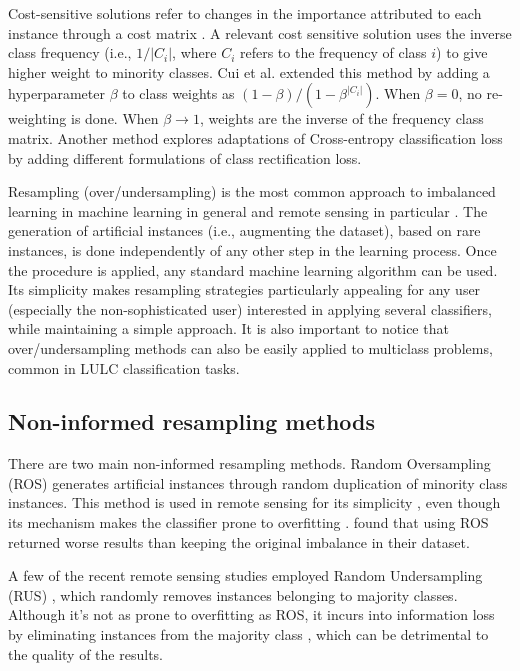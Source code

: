 Cost-sensitive solutions refer to changes in the importance attributed to each
instance through a cost matrix \cite{Huang2016,Cui2019,Dong2017}. A
relevant cost sensitive solution
\cite{Huang2016} uses  the inverse class frequency (i.e., $1/|C_i|$, where $C_i$ refers
to the frequency of class $i$) to give higher weight to
minority classes. Cui et al. \cite{Cui2019} extended this method by adding a
hyperparameter $\beta$ to class weights as $(1-\beta)/(1-\beta^{|C_i|})$. When
$\beta=0$, no re-weighting is done. When $\beta\rightarrow 1$, weights are the
inverse of the frequency class matrix. Another method \cite{Dong2017} explores
adaptations of Cross-entropy classification loss by adding different
formulations of class rectification loss.

Resampling (over/undersampling) is the most common approach to imbalanced
learning in machine
learning in general and remote sensing in particular \cite{Feng2019}. The
generation of artificial instances (i.e., augmenting the dataset), based on
rare instances, is done independently of any other step in the learning
process. Once the procedure is applied, any standard machine learning
algorithm can be used. Its simplicity makes resampling strategies particularly
appealing for any user (especially the non-sophisticated user) interested in
applying several classifiers, while maintaining a simple approach. It is also
important to notice that over/undersampling methods can also be easily applied
to multiclass problems, common in LULC classification tasks.

\subsection{Non-informed resampling methods}

There are two main non-informed resampling methods. Random Oversampling (ROS)
generates artificial instances through random duplication of minority class
instances. This method is used in remote sensing for its simplicity
\cite{Sharififar2019, Hounkpatin2018}, even though its mechanism makes the
classifier prone to overfitting \cite{Krawczyk2016}. \cite{Hounkpatin2018}
found that using ROS returned worse results than keeping the original
imbalance in their dataset.

A few of the recent remote sensing studies employed Random Undersampling (RUS)
\cite{Ferreira2019}, which randomly removes instances belonging to majority
classes. Although it's not as prone to overfitting as ROS, it incurs into
information loss by eliminating instances from the majority class
\cite{Feng2019}, which can be detrimental to the quality of the results.

